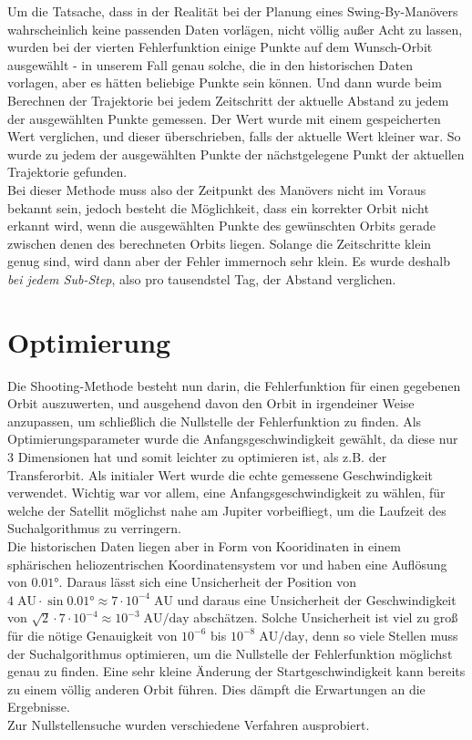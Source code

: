 Um die Tatsache, dass in der Realität bei der Planung eines Swing-By-Manövers wahrscheinlich keine passenden Daten vorlägen, nicht völlig außer Acht zu lassen, wurden bei der vierten Fehlerfunktion einige Punkte auf dem Wunsch-Orbit ausgewählt - in unserem Fall genau solche, die in den historischen Daten vorlagen, aber es hätten beliebige Punkte sein können. Und dann wurde beim Berechnen der Trajektorie bei jedem Zeitschritt der aktuelle Abstand zu jedem der ausgewählten Punkte gemessen. Der Wert wurde mit einem gespeicherten Wert verglichen, und dieser überschrieben, falls der aktuelle Wert kleiner war. So wurde zu jedem der ausgewählten Punkte der nächstgelegene Punkt der aktuellen Trajektorie gefunden.\\
Bei dieser Methode muss also der Zeitpunkt des Manövers nicht im Voraus bekannt sein, jedoch besteht die Möglichkeit, dass ein korrekter Orbit nicht erkannt wird, wenn die ausgewählten Punkte des gewünschten Orbits gerade zwischen denen des berechneten Orbits liegen. Solange die Zeitschritte klein genug sind, wird dann aber der Fehler immernoch sehr klein. Es wurde deshalb \textit{bei jedem Sub-Step}, also pro tausendstel Tag, der Abstand verglichen.






\section{Optimierung}
Die Shooting-Methode besteht nun darin, die Fehlerfunktion für einen gegebenen Orbit auszuwerten, und ausgehend davon den Orbit in irgendeiner Weise anzupassen, um schließlich die Nullstelle der Fehlerfunktion zu finden.
Als Optimierungsparameter wurde die Anfangsgeschwindigkeit gewählt, da diese nur 3 Dimensionen hat und somit leichter zu optimieren ist, als z.B. der Transferorbit.
Als initialer Wert wurde die echte gemessene Geschwindigkeit verwendet. Wichtig war vor allem, eine Anfangsgeschwindigkeit zu wählen, für welche der Satellit möglichst nahe am Jupiter vorbeifliegt, um die Laufzeit des Suchalgorithmus zu verringern. \\
Die historischen Daten liegen aber in Form von Kooridinaten in einem sphärischen heliozentrischen Koordinatensystem vor und haben eine Auflösung von $0.01\text{°}$.
Daraus lässt sich eine Unsicherheit der Position von $4\;\text{AU}\cdot\sin 0.01\text{°}\approx 7\cdot 10^{-4}\;\text{AU}$ und daraus eine Unsicherheit der Geschwindigkeit von $\sqrt{2}\cdot 7\cdot 10^{-4} \approx 10^{-3}\;\text{AU/day}$ abschätzen.
Solche Unsicherheit ist viel zu groß für die nötige Genauigkeit von $10^{-6}$ bis $10^{-8}\;\text{AU/day}$, denn so viele Stellen muss der Suchalgorithmus optimieren, um die Nullstelle der Fehlerfunktion möglichst genau zu finden. Eine sehr kleine Änderung der Startgeschwindigkeit kann bereits zu einem völlig anderen Orbit führen. Dies dämpft die Erwartungen an die Ergebnisse.\\
Zur Nullstellensuche wurden verschiedene Verfahren ausprobiert.

